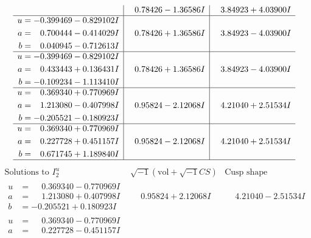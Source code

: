 \documentclass[1p]{elsarticle_modified}
\theoremstyle{definition}
\newcommand{\I}{\sqrt{-1}}
\begin{document}
$$\begin{array}{c|c|c}
 & \phantom{-}0.78426 - 1.36586 I & \phantom{-}3.84923 + 4.03900 I \\ \hline\begin{aligned}
u &= -0.399469 - 0.829102 I \\
a &= \phantom{-}0.700444 - 0.414029 I \\
b &= \phantom{-}0.040945 - 0.712613 I\end{aligned}
 & \phantom{-}0.78426 + 1.36586 I & \phantom{-}3.84923 - 4.03900 I \\ \hline\begin{aligned}
u &= -0.399469 - 0.829102 I \\
a &= \phantom{-}0.433443 + 0.136431 I \\
b &= -0.109234 - 1.113410 I\end{aligned}
 & \phantom{-}0.78426 + 1.36586 I & \phantom{-}3.84923 - 4.03900 I \\ \hline\begin{aligned}
u &= \phantom{-}0.369340 + 0.770969 I \\
a &= \phantom{-}1.213080 - 0.407998 I \\
b &= -0.205521 - 0.180923 I\end{aligned}
 & \phantom{-}0.95824 - 2.12068 I & \phantom{-}4.21040 + 2.51534 I \\ \hline\begin{aligned}
u &= \phantom{-}0.369340 + 0.770969 I \\
a &= \phantom{-}0.227728 + 0.451157 I \\
b &= \phantom{-}0.671745 + 1.189840 I\end{aligned}
 & \phantom{-}0.95824 - 2.12068 I & \phantom{-}4.21040 + 2.51534 I\\
 \hline 
 \end{array}$$\newpage$$\begin{array}{c|c|c}  
\text{Solutions to }I^u_{2}& \I (\text{vol} + \sqrt{-1}CS) & \text{Cusp shape}\\
 \hline 
\begin{aligned}
u &= \phantom{-}0.369340 - 0.770969 I \\
a &= \phantom{-}1.213080 + 0.407998 I \\
b &= -0.205521 + 0.180923 I\end{aligned}
 & \phantom{-}0.95824 + 2.12068 I & \phantom{-}4.21040 - 2.51534 I \\ \hline\begin{aligned}
u &= \phantom{-}0.369340 - 0.770969 I \\
a &= \phantom{-}0.227728 - 0.451157 I \\

\end{aligned}
\end{array}$$
\end{document}
